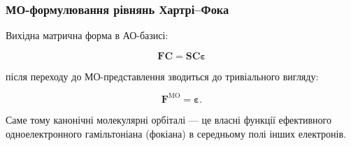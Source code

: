 \subsubsection{МО-формулювання рівнянь Хартрі–Фока}

Вихідна матрична форма в АО-базисі:

\begin{equation}
    \mathbf{F} \mathbf{C} = \mathbf{S} \mathbf{C} \boldsymbol{\varepsilon}
\end{equation}

після переходу до МО-представлення зводиться до тривіального вигляду:

\begin{equation}
    \mathbf{F}^{\text{MO}} = \boldsymbol{\varepsilon}.
\end{equation}

Саме тому канонічні молекулярні орбіталі — це власні функції ефективного одноелектронного гамільтоніана (фокіана) в середньому полі інших електронів.